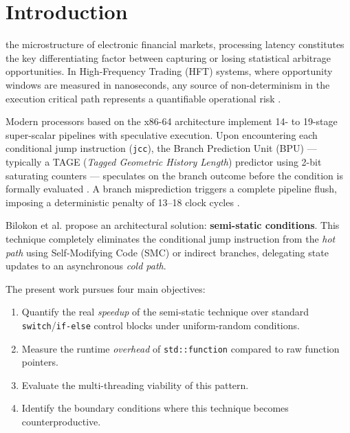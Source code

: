 \section{Introduction}

 the microstructure of electronic financial markets, processing latency constitutes the key differentiating factor between capturing or losing statistical arbitrage opportunities. In High-Frequency Trading (HFT) systems, where opportunity windows are measured in nanoseconds, any source of non-determinism in the execution critical path represents a quantifiable operational risk \cite{bilokon2025}.

Modern processors based on the x86-64 architecture implement 14- to 19-stage super-scalar pipelines with speculative execution. Upon encountering each conditional jump instruction (\texttt{jcc}), the Branch Prediction Unit (BPU) --- typically a TAGE (\textit{Tagged Geometric History Length}) predictor using 2-bit saturating counters --- speculates on the branch outcome before the condition is formally evaluated \cite{intel2012}. A branch misprediction triggers a complete pipeline flush, imposing a deterministic penalty of 13--18 clock cycles \cite{fog2023}.

Bilokon et al. \cite{bilokon2025} propose an architectural solution: \textbf{semi-static conditions}. This technique completely eliminates the conditional jump instruction from the \textit{hot path} using Self-Modifying Code (SMC) or indirect branches, delegating state updates to an asynchronous \textit{cold path}.

The present work pursues four main objectives:
\begin{enumerate}
    \item Quantify the real \textit{speedup} of the semi-static technique over standard \texttt{switch}/\texttt{if-else} control blocks under uniform-random conditions.
    \item Measure the runtime \textit{overhead} of \texttt{std::function} compared to raw function pointers.
    \item Evaluate the multi-threading viability of this pattern.
    \item Identify the boundary conditions where this technique becomes counterproductive.
\end{enumerate}
